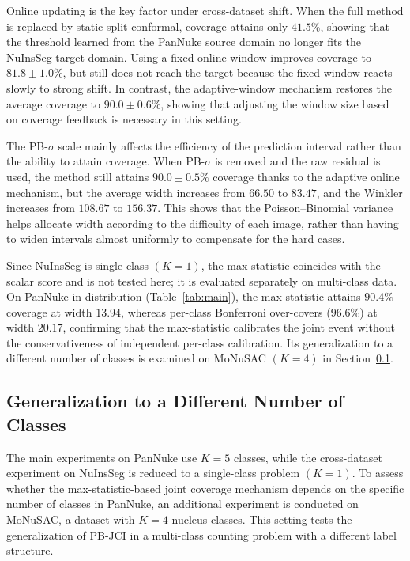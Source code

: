 \documentclass[smallextended,natbib]{svjour3}
\begin{document}
Online updating is the key factor under cross-dataset shift. When the full method is
replaced by static split conformal, coverage attains only $41.5\%$, showing that the
threshold learned from the PanNuke source domain no longer fits the NuInsSeg target
domain. Using a fixed online window improves coverage to $81.8\pm1.0\%$, but still
does not reach the target because the fixed window reacts slowly to strong shift. In
contrast, the adaptive-window mechanism restores the average coverage to
$90.0\pm0.6\%$, showing that adjusting the window size based on coverage feedback is
necessary in this setting.

The PB-\(\sigma\) scale mainly affects the efficiency of the prediction interval
rather than the ability to attain coverage. When PB-\(\sigma\) is removed and the
raw residual is used, the method still attains $90.0\pm0.5\%$ coverage thanks to the
adaptive online mechanism, but the average width increases from $66.50$ to $83.47$,
and the Winkler increases from $108.67$ to $156.37$. This shows that the
Poisson--Binomial variance helps allocate width according to the difficulty of each
image, rather than having to widen intervals almost uniformly to compensate for the
hard cases.

Since NuInsSeg is single-class \((K=1)\), the max-statistic coincides with the
scalar score and is not tested here; it is evaluated separately on multi-class data.
On PanNuke in-distribution (Table~\ref{tab:main}), the max-statistic attains
$90.4\%$ coverage at width $13.94$, whereas per-class Bonferroni over-covers
($96.6\%$) at width $20.17$, confirming that the max-statistic calibrates the joint
event without the conservativeness of independent per-class calibration. Its
generalization to a different number of classes is examined on MoNuSAC \((K=4)\) in
Section~\ref{sec:monusac}.

\subsection{Generalization to a Different Number of Classes}\label{sec:monusac}

The main experiments on PanNuke use \(K=5\) classes, while the cross-dataset
experiment on NuInsSeg is reduced to a single-class problem \((K=1)\). To assess
whether the max-statistic-based joint coverage mechanism depends on the specific
number of classes in PanNuke, an additional experiment is conducted on MoNuSAC, a
dataset with \(K=4\) nucleus classes. This setting tests the generalization of
PB-JCI in a multi-class counting problem with a different label structure.
\end{document}
